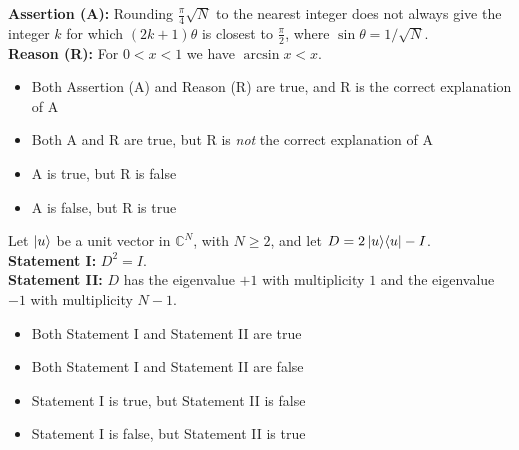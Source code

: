 \documentclass[11pt,a4paper]{article}
\newcommand{\optlabel}[1]{\textbf{(#1)}}
\newenvironment{qitem}[1]{\begin{list}{}{\setlength{\leftmargin}{3.3em}\setlength{\labelwidth}{3.1em}%
  \setlength{\labelsep}{0.2em}\setlength{\topsep}{3pt}\setlength{\parsep}{3pt}}\item[\textbf{Q.#1}\hfill]}{\end{list}}
\newcommand{\qsep}{\par\vspace{2pt}{\color{black!15}\hrule}\vspace{4pt}}
\begin{document}
\begin{qitem}{17}
\textbf{Assertion (A):} Rounding $\frac\pi4\sqrt N$ to the nearest integer does not always give the integer $k$ for which
$(2k+1)\theta$ is closest to $\frac\pi2$, where $\sin\theta = 1/\sqrt N$.\\[1mm]
\textbf{Reason (R):} For $0 < x < 1$ we have $\arcsin x < x$.
\begin{itemize}[leftmargin=2.6em, labelsep=0.4em, itemsep=2pt, topsep=3pt]
\item[\optlabel{A}] Both Assertion (A) and Reason (R) are true, and R is the correct explanation of A
\item[\optlabel{B}] Both A and R are true, but R is \emph{not} the correct explanation of A
\item[\optlabel{C}] A is true, but R is false
\item[\optlabel{D}] A is false, but R is true
\end{itemize}
\end{qitem}
\qsep

\begin{qitem}{18}
Let $\ket{u}$ be a unit vector in $\mathbb{C}^{N}$, with $N \ge 2$, and let $D = 2\ket{u}\!\bra{u} - I$.\\[1mm]
\textbf{Statement I:} $D^2 = I$.\\[1mm]
\textbf{Statement II:} $D$ has the eigenvalue $+1$ with multiplicity $1$ and the eigenvalue $-1$ with multiplicity $N - 1$.
\begin{itemize}[leftmargin=2.6em, labelsep=0.4em, itemsep=2pt, topsep=3pt]
\item[\optlabel{A}] Both Statement I and Statement II are true
\item[\optlabel{B}] Both Statement I and Statement II are false
\item[\optlabel{C}] Statement I is true, but Statement II is false
\item[\optlabel{D}] Statement I is false, but Statement II is true
\end{itemize}
\end{qitem}
\qsep
\end{document}
